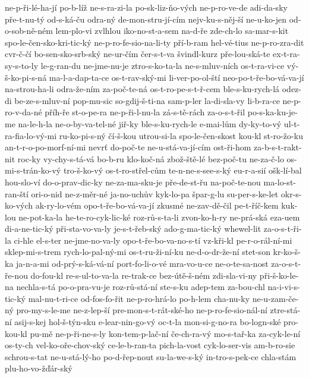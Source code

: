 {ne-p-ři-lé-ha-jí
po-b-líž
ne-s-ra-zi-la
po-sk-liz-ňo-vých
ne-p-ro-ve-de
adi-da-sky
pře-t-nu-tý
od-s-ká-ču
odra-ný
de-mon-stru-jí-cím
nejv-ku-s-něj-ší
ne-u-ko-jen
od-o-sob-ně-ném
lem-plo-vi
zvlhlou
iko-no-st-a-sem
na-d-ře
zde-ch-lo
sa-mar-s-kit
spo-le-čen-sko-kri-tic-ký
ne-p-ro-fe-sio-na-li-ty
pří-b-ram
hel-vé-tius
ne-p-ro-zra-dit
cvr-č-čí
bo-sen-sko-srb-ský
ne-ur-čím
čer-s-t-va
švindl-kurz
pře-lou-ská-te
ex-t-ra-sy-s-to-ly
le-g-ran-du
ne-jme-nu-je
ztro-s-ko-ta-la
ne-s-mluv-ních
os-t-ra-vi-ce
vý-š-ko-pi-s-ná
ma-l-a-dap-ta-ce
os-t-rav-ský-mi
li-ver-po-ol-ští
neo-po-t-ře-bo-vá-va-jí
na-strou-ha-li
odra-že-ním
za-poč-te-ná
os-t-ro-pe-s-t-ř-cem
ble-s-ku-rych-lá
odez-di
be-ze-s-mluv-ní
pop-mu-sic
so-gdij-š-ti-na
sam-p-ler
la-di-sla-vy
li-b-ra-ce
ne-p-ro-v-da-né
příh-ře
st-o-pe-ra
ne-p-ři-l-nu-la
zá-s-tě-rách
za-o-s-t-řil
po-s-ka-ku-je-me
na-le-h-la
ne-o-by-va-tel-né
jiř-ky
ble-s-ku-rych-le
e-mai-lům
dy-ky-to-vý
ul-t-ra-fia-lo-vý-mi
ru-ko-pi-s-ný
čí-š-kou
utrou-si-la
spo-le-čen-skost
kou-kl
st-ro-žo-ku
an-t-r-o-po-morf-ní-mi
nevrť
do-poč-te
ne-u-stá-va-jí-cím
ost-ři-hom
za-b-s-t-rakt-nit
roc-ky
vy-chy-s-tá-vá
bo-b-ru
klo-koč-ná
zbož-ště-lé
bez-poč-tu
ne-za-č-lo
os-mi-s-trán-ko-vý
tro-š-ko-vý
os-t-ro-střel-cům
te-n-ne-s-see-s-ký
eu-r-a-sií
ošk-lí-bal
hou-slo-ví
do-o-prav-dic-ky
ne-za-ma-sku-je
pře-de-st-řu
na-poč-te-nou
ma-lo-st-ran-ští
ori-o-nid
ne-z-měr-né
ja-no-uchův
kyk-lo-pa
špar-g-lu
su-per-s-ke-let
okr-s-ko-vých
ak-ry-lo-vém
opo-t-ře-bo-vá-va-jí
zkusmé
ne-zav-dě-čil
pe-t-říč-kem
kuk-lou
ne-pot-ka-la
he-te-ro-cyk-lic-ké
roz-rů-s-ta-li
zvon-ko-h-ry
ne-prá-ská
eza-uem
di-a-ne-tic-ký
při-sta-vo-va-ly
je-s-t-řeb-ský
ado-g-ma-tic-ký
whewel-lit
za-o-s-t-ři-la
ci-hle
el-s-ter
ne-jme-no-va-ly
opo-t-ře-bo-va-no-s-tí
vz-kři-kl
pe-r-o-rál-ní-mi
sklep-mi-s-trem
rych-lo-pal-ný-mi
os-t-ru-ži-ní-ku
ne-d-o-dr-že-ní
stet-son
kr-ko-š-ka
ja-n-a-mi
od-prý-s-ká-vá-ní
port-fo-li-o-vé
mra-vo-u-ce
ne-o-te-sa-nost
za-o-s-t-ře-nou
do-fou-kl
re-s-ul-to-va-la
re-trak-ce
bez-útě-š-ném
zdi-sla-vi-ny
při-š-ko-le-na
nechla-s-tá
po-o-pra-vu-je
roz-rů-stá-ní
ste-s-ku
adep-tem
za-bou-chl
na-i-vi-s-tic-ký
mal-nu-t-ri-ce
od-fos-fo-řit
ne-p-ro-hrá-lo
po-h-lem
cha-nu-ky
ne-u-zam-če-ný
pro-my-s-le-me
ne-z-lep-ší
pre-mon-s-t-rát-ské-ho
ne-p-ro-fe-sio-nál-ní
ztre-stá-ní
asij-s-kej
hol-š-týn-sku
e-lear-nin-go-vý
oc-t-la
mon-si-g-no-ra
bo-logn-ské
pro-kou-kl
pu-mě
ne-p-ři-ne-s-ly
kon-tem-p-lač-ní
če-ch-ra-vý
mo-s-tař-ka
za-cyk-le-ní
os-ty-ch
vel-ko-oře-chov-ský
ce-le-b-ran-ta
pich-la-vost
cyk-lo-ser-vis
am-b-ro-sie
schrou-s-tat
ne-u-stá-lý-ho
po-d-řep-nout
su-la-we-s-ký
in-tro-s-pek-ce
chla-stám
plu-ho-vo-žďár-ský
}
